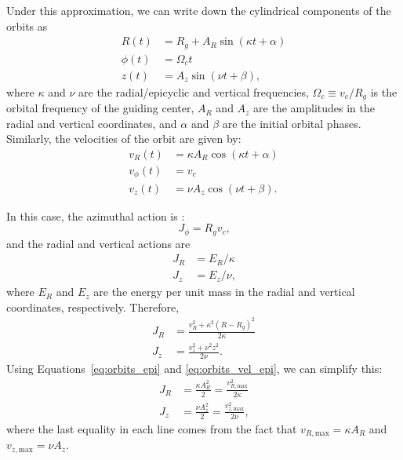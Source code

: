 \documentclass[twocolumn]{aastex62}
\newcommand{\beq}{\begin{equation}}
\newcommand{\eeq}{\end{equation}}
\begin{document}
Under this approximation, we can write down the cylindrical components
of the orbits as
\beq\label{eq:orbits_epi}
\begin{split}
R(t) &= R_g + A_R \sin{(\kappa t + \alpha)} \\
\phi(t) &= \Omega_c t \\
z(t) &= A_z \sin{(\nu t + \beta)}
\text{,}
\end{split}
\eeq
where $\kappa$ and $\nu$ are the radial/epicyclic and vertical frequencies, $\Omega_c
\equiv v_c/R_g$ is the orbital frequency of the guiding center, $A_R$ and
$A_z$ are the amplitudes in the radial and vertical coordinates, and $\alpha$
and $\beta$ are the initial orbital phases. Similarly, the velocities of the
orbit are given by:
\beq\label{eq:orbits_vel_epi}
\begin{split}
v_R(t) &= \kappa A_R \cos{(\kappa t + \alpha)} \\
v_{\phi}(t) &= v_c \\
v_z(t) &= \nu A_z \cos{(\nu t + \beta)}
\text{.}
\end{split}
\eeq

In this case, 
the azimuthal action is
\citep[][Section~3.5.3b]{2008gady.book.....B}:
\beq\label{eq:Jphi_epi}
J_{\phi} = R_g v_c\text{,}
\eeq
and the radial and vertical actions are
\beq\label{eq:JR_Jz_epi}
\begin{split}
J_R &= E_R / \kappa \\
J_z &= E_z / \nu\text{,} 
\end{split}
\eeq
where $E_R$ and $E_z$ are the energy per unit mass in the radial and vertical
coordinates, respectively. Therefore,
\beq\label{eq:JR_Jz_epi_energy}
\begin{split}
J_R &= \frac{v_R^2 + \kappa^2 (R-R_g)^2}{2\kappa} \\
J_z &= \frac{v_z^2 + \nu^2 z^2}{2\nu}\text{.}
\end{split}
\eeq
Using Equations~\eqref{eq:orbits_epi} and \eqref{eq:orbits_vel_epi}, we can
simplify this:
\beq\label{eq:JR_Jz_epi_final}
\begin{split}
J_R &= \frac{\kappa A_R^2}{2} = \frac{v_{R,\text{max}}^2}{2\kappa} \\
J_z &= \frac{\nu A_z^2}{2} = \frac{v_{z,\text{max}}^2}{2\nu}\text{,}
\end{split}
\eeq
where the last equality in each line comes from the fact that
$v_{R,\text{max}} = \kappa A_R$ and $v_{z,\text{max}} = \nu A_z$.
\end{document}
